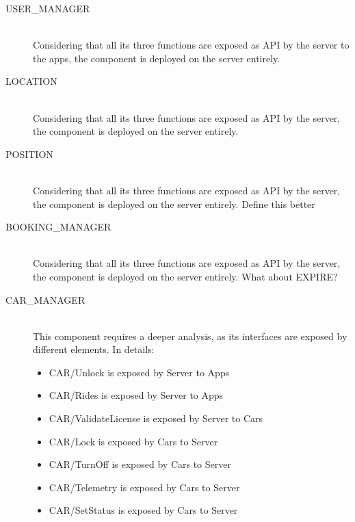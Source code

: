 \documentclass[11pt]{article} %
\begin{document}
\begin{description}
	\item[USER\_MANAGER] \hfill \\
	Considering that all its three functions are exposed as API by the server to the apps, the component is deployed on the server entirely.
		
	\item[LOCATION] \hfill \\
	Considering that all its three functions are exposed as API by the server, the component is deployed on the server entirely.

	\item[POSITION] \hfill \\
	Considering that all its three functions are exposed as API by the server, the component is deployed on the server entirely. {\color{red} {Define this better}}
	
	\item[BOOKING\_MANAGER] \hfill \\
	Considering that all its three functions are exposed as API by the server, the component is deployed on the server entirely. {\color{red} {What about EXPIRE?}}
	
	\item[CAR\_MANAGER] \hfill \\
	This component requires a deeper analysis, as its interfaces are exposed by different elements. In details:
	\begin{itemize}
		\item CAR/Unlock is exposed by Server to Apps
		\item CAR/Rides is exposed by Server to Apps
		\item CAR/ValidateLicense is exposed by Server to Cars
		\item CAR/Lock is exposed by Cars to Server
		\item CAR/TurnOff is exposed by Cars to Server
		\item CAR/Telemetry is exposed by Cars to Server
		\item CAR/SetStatus is exposed by Cars to Server
	\end{itemize}
\end{description}
	
\end{document}
